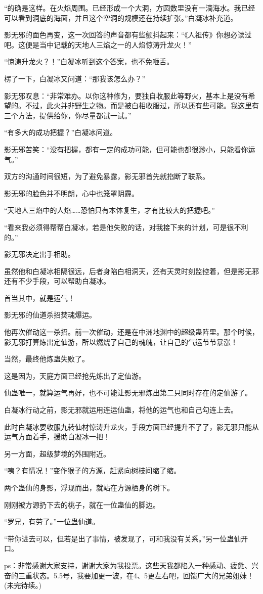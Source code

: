 \begin{this_body}
“的确是这样。在火焰周围。已经形成一个大洞，方圆数里没有一滴海水。我已经可以看到洞底的海面，并且这个空洞的规模还在持续扩张。”白凝冰补充道。

影无邪的面色再变，这一次回答的声音都有些颤抖起来：“《人祖传》你想必读过吧。这便是当中记载的天地人三焰之一的人焰惊涛升龙火！”

“惊涛升龙火？！”白凝冰听到这个答案，也不免咂舌。

楞了一下，白凝冰又问道：“那我该怎么办？”

影无邪叹息：“非常难办。以你这种修为，要独自收服此等野火，基本上是没有希望的。不过，此火并非野生之物。而是被白相收服过，所以还有些可能。我这里有三个方法，提供给你，你尽量都试一试。”

“有多大的成功把握？”白凝冰问道。

影无邪苦笑：“没有把握，都有一定的成功可能，但可能也都很渺小，只能看你运气。”

双方的沟通时间很短，为了避免暴露，影无邪首先就掐断了联系。

影无邪的脸色并不明朗，心中也笼罩阴霾。

“天地人三焰中的人焰……恐怕只有本体复生，才有比较大的把握吧。”

“看来我必须得帮帮白凝冰，若是他失败的话，对我接下来的计划，可是很不利的。”

影无邪决定出手相助。

虽然他和白凝冰相隔很远，后者身陷白相洞天，还有天灵时刻监控着，但是影无邪还有不少手段，可以帮助白凝冰。

首当其中，就是运气！

影无邪的仙道杀招焚魂爆运。

他再次催动这一杀招。前一次催动，还是在中洲地渊中的超级蛊阵里。那个时候，影无邪打算炼出定仙游，所以燃烧了自己的魂魄，让自己的气运节节暴涨！

当然，最终他炼蛊失败了。

这是因为，天庭方面已经抢先炼出了定仙游。

仙蛊唯一，就算运气再好，也不可能让影无邪炼出第二只同时存在的定仙游了。

白凝冰行动之前，影无邪就运用连运仙蛊，将他的运气也和自己勾连上去。

此时白凝冰要收服九转仙材惊涛升龙火，手段方面已经提升不了了，影无邪只能从运气方面着手，援助白凝冰一把！

另一方面，超级梦境的外围附近。

“咦？有情况！”变作猴子的方源，赶紧向树枝间缩了缩。

两个蛊仙的身影，浮现而出，就站在方源栖身的树下。

刚刚被方源扔下去的桃子，就在一位蛊仙的脚边。

“罗兄，有劳了。”一位蛊仙道。

“带你进去可以，但若是出了事情，被发现了，可和我没有关系。”另一位蛊仙开口。

ps：非常感谢大家支持，谢谢大家为我投票。这些天我都陷入一种感动、疲惫、兴奋的三重状态。5.5号，我要加更一波，在4、5更左右吧，回馈广大的兄弟姐妹！(未完待续。)

\end{this_body}

